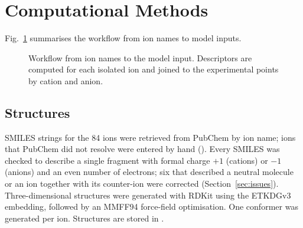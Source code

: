 \section{Computational Methods}
\label{sec:comp}

Fig.~\ref{fig:pipeline} summarises the workflow from ion names to model inputs.

\begin{figure}[t]
\centering
{}
\caption{Workflow from ion names to the model input. Descriptors are computed for each isolated ion and joined to the experimental points by cation and anion.}
\label{fig:pipeline}
\end{figure}

\subsection{Structures}
SMILES strings for the 84 ions were retrieved from PubChem\cite{kim2023pubchem} by ion name; ions that PubChem did not resolve were entered by hand (). Every SMILES was checked to describe a single fragment with formal charge $+1$ (cations) or $-1$ (anions) and an even number of electrons; six that described a neutral molecule or an ion together with its counter-ion were corrected (Section~\ref{sec:issues}). Three-dimensional structures were generated with RDKit\cite{rdkit} using the ETKDGv3 embedding\cite{wang2020improving}, followed by an MMFF94 force-field optimisation\cite{halgren1996mmff}. One conformer was generated per ion. Structures are stored in .

